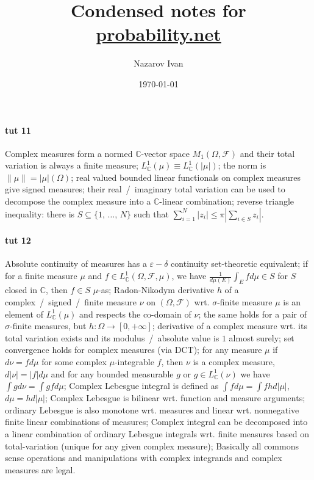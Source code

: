 \documentclass[a4paper]{article}
\title{Condensed notes for \url{probability.net}}
\author{Nazarov Ivan}
\date{\today}
\newcommand{\Fcal}{\mathcal{F}}
\newcommand{\cplx}{\mathbb{C}}
\begin{document}
\maketitle


\paragraph{tut 11} %
\label{par:tut_11}

Complex measures form a normed $\cplx$-vector space $M_1(\Omega, \Fcal)$ and their
total variation is always a finite measure;
%
$L^1_\cplx(\mu) \equiv L^1_\cplx(|\mu|)$;
%
the norm is $\|\mu\| = |\mu|(\Omega)$;
%
real valued bounded linear functionals on complex measures give signed measures;
%
their real~/~imaginary total variation can be used to decompose the complex measure
into a $\cplx$-linear combination;
%
reverse triangle inequality: there is $S \subseteq \{1,\, \ldots,\,N\}$ such that
$\sum_{i=1}^N |z_i| \leq \pi |\sum_{i \in S} z_i|$.



\paragraph{tut 12} %
\label{par:tut_12}

Absolute continuity of measures has a $\varepsilon - \delta$ continuity set-theoretic
equivalent;
%
if for a finite measure $\mu$ and $f \in L^1_\cplx(\Omega, \Fcal, \mu)$, we have
$\tfrac1{d\mu(E)} \int_E f d\mu \in S$ for $S$ closed in $\cplx$, then $f \in S$
$\mu$-as;
%
Radon-Nikodym derivative $h$ of a complex~/~signed~/~finite measure $\nu$ on
$(\Omega, \Fcal)$ wrt. $\sigma$-finite measure $\mu$ is an element of $L^1_\cplx(\mu)$
and respects the co-domain of $\nu$;
%
the same holds for a pair of $\sigma$-finite measures, but $h\colon \Omega \to [0, +\infty]$;
%
derivative of a complex measure wrt. its total variation exists and its modulus~/~absolute
value is $1$ almost surely;
%
set convergence holds for complex measures (via DCT);
%
for any measure $\mu$ if $d\nu = f d\mu$ for some complex $\mu$-integrable $f$, then
$\nu$ is a complex measure, $d|\nu| = |f| d\mu$ and for any bounded measurable $g$ or
$g \in L^1_\cplx(\nu)$ we have $\int g d\nu = \int g f d\mu$;
%
Complex Lebesgue integral is defined as $\int f d\mu = \int f h d|\mu|$,
$d\mu = h d|\mu|$;
%
Complex Lebesgue is bilinear wrt. function and measure arguments;
%
ordinary Lebesgue is also monotone wrt. measures and linear wrt. nonnegative finite
linear combinations of measures;
%
Complex integral can be decomposed into a linear combination of ordinary Lebesgue
integrals wrt. finite measures based on total-variation (unique for any given complex
measure);
%
Basically all commons sense operations and manipulations with complex integrands
and complex measures are legal.
\end{document}
